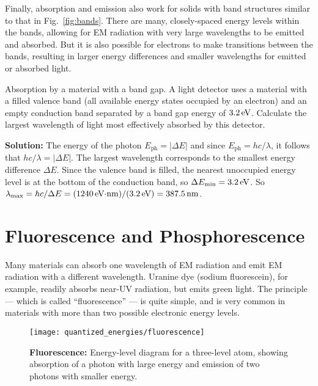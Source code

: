 Finally, absorption and emission also work for solids with band structures
similar to that in Fig.~\ref{fig:bands}. There are many, closely-spaced
energy levels within the bands, allowing for EM radiation with very 
large wavelengths to be emitted and absorbed. But it is also possible for
electrons to make transitions between the bands, resulting in larger
energy differences and smaller wavelengths for emitted or absorbed light.
				
\begin{example}{Absorption by a material with a band gap.}
\label{exam:absorption_bands}
A light detector uses a material with a filled valence band (all available
energy states occupied by an electron) and an empty conduction band separated
by a band gap energy of $3.2\,\mbox{eV}$. Calculate the largest wavelength of light 
most effectively absorbed by this detector.

{\bf Solution:} 
The energy of the photon $E_\text{ph} = |\Delta E|$
and since $E_\text{ph} = hc/\lambda$, it follows that $hc/\lambda = |\Delta E|$.
The largest wavelength corresponds to the smallest energy
difference $\Delta E$. Since the valence band is filled, the nearest 
unoccupied energy level is at the bottom of the conduction band, so
$\Delta E_\text{min} = 3.2\,\mbox{eV}$.
So $\lambda_\text{max} = hc/\Delta E 
            = (1240\,\mbox{eV$\cdot$nm})/(3.2 \,\mbox{eV}) = 387.5\,\mbox{nm}$. 
\end{example}

\section{Fluorescence and Phosphorescence}

Many materials can absorb one wavelength of EM radiation and emit EM
radiation with a different wavelength. Uranine dye (sodium fluorescein),
for example, readily absorbs near-UV radiation, but emits green light. The
principle --- which is called ``fluorescence'' --- is quite simple,
and is very common in materials with more than two possible electronic
energy levels.


\begin{figure}
\begin{center}
\texttt{[image: quantized\_energies/fluorescence]}
\end{center}
\caption{{\bf Fluorescence: } Energy-level diagram for a 
three-level atom, showing
absorption of a photon with large energy and emission of two
photons with smaller energy. }
\label{fig:fluorescence}
\end{figure}
		
